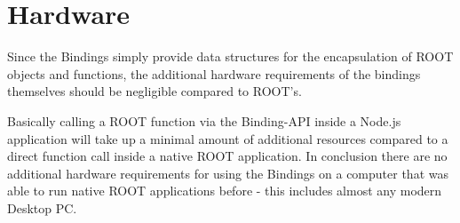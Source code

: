 \section{Hardware}

Since the Bindings simply provide data structures for the encapsulation of ROOT objects and functions, the additional hardware requirements of the bindings themselves 
should be negligible compared to ROOT's.\par
Basically calling a ROOT function via the Binding-API inside a Node.js application will take up a minimal amount of additional resources compared to a direct function call inside a native ROOT application.
In conclusion there are no additional hardware requirements for using the Bindings on a computer that was able to run native ROOT applications before - this includes almost any modern Desktop PC.
